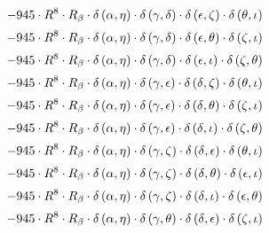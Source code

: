 \begin{subequations}
\begin{gather}
 \\[0.2em] \notag 		 - 945 \cdot R^{8} \cdot R_{\beta{}} \cdot \delta{}\left(\alpha{}, \eta{}\right) \cdot \delta{}\left(\gamma{}, \delta{}\right) \cdot \delta{}\left(\epsilon{}, \zeta{}\right) \cdot \delta{}\left(\theta{}, \iota{}\right) 
 \\[0.2em] \notag 		 - 945 \cdot R^{8} \cdot R_{\beta{}} \cdot \delta{}\left(\alpha{}, \eta{}\right) \cdot \delta{}\left(\gamma{}, \delta{}\right) \cdot \delta{}\left(\epsilon{}, \theta{}\right) \cdot \delta{}\left(\zeta{}, \iota{}\right) 
 \\[0.2em] \notag 		 - 945 \cdot R^{8} \cdot R_{\beta{}} \cdot \delta{}\left(\alpha{}, \eta{}\right) \cdot \delta{}\left(\gamma{}, \delta{}\right) \cdot \delta{}\left(\epsilon{}, \iota{}\right) \cdot \delta{}\left(\zeta{}, \theta{}\right) 
 \\[0.2em] \notag 		 - 945 \cdot R^{8} \cdot R_{\beta{}} \cdot \delta{}\left(\alpha{}, \eta{}\right) \cdot \delta{}\left(\gamma{}, \epsilon{}\right) \cdot \delta{}\left(\delta{}, \zeta{}\right) \cdot \delta{}\left(\theta{}, \iota{}\right) 
 \\[0.2em] \notag 		 - 945 \cdot R^{8} \cdot R_{\beta{}} \cdot \delta{}\left(\alpha{}, \eta{}\right) \cdot \delta{}\left(\gamma{}, \epsilon{}\right) \cdot \delta{}\left(\delta{}, \theta{}\right) \cdot \delta{}\left(\zeta{}, \iota{}\right) 
 \\[0.2em] \notag 		 - 945 \cdot R^{8} \cdot R_{\beta{}} \cdot \delta{}\left(\alpha{}, \eta{}\right) \cdot \delta{}\left(\gamma{}, \epsilon{}\right) \cdot \delta{}\left(\delta{}, \iota{}\right) \cdot \delta{}\left(\zeta{}, \theta{}\right) 
 \\[0.2em] \notag 		 - 945 \cdot R^{8} \cdot R_{\beta{}} \cdot \delta{}\left(\alpha{}, \eta{}\right) \cdot \delta{}\left(\gamma{}, \zeta{}\right) \cdot \delta{}\left(\delta{}, \epsilon{}\right) \cdot \delta{}\left(\theta{}, \iota{}\right) 
 \\[0.2em] \notag 		 - 945 \cdot R^{8} \cdot R_{\beta{}} \cdot \delta{}\left(\alpha{}, \eta{}\right) \cdot \delta{}\left(\gamma{}, \zeta{}\right) \cdot \delta{}\left(\delta{}, \theta{}\right) \cdot \delta{}\left(\epsilon{}, \iota{}\right) 
 \\[0.2em] \notag 		 - 945 \cdot R^{8} \cdot R_{\beta{}} \cdot \delta{}\left(\alpha{}, \eta{}\right) \cdot \delta{}\left(\gamma{}, \zeta{}\right) \cdot \delta{}\left(\delta{}, \iota{}\right) \cdot \delta{}\left(\epsilon{}, \theta{}\right) 
 \\[0.2em] \notag 		 - 945 \cdot R^{8} \cdot R_{\beta{}} \cdot \delta{}\left(\alpha{}, \eta{}\right) \cdot \delta{}\left(\gamma{}, \theta{}\right) \cdot \delta{}\left(\delta{}, \epsilon{}\right) \cdot \delta{}\left(\zeta{}, \iota{}\right) 

\end{gather}
\end{subequations}

